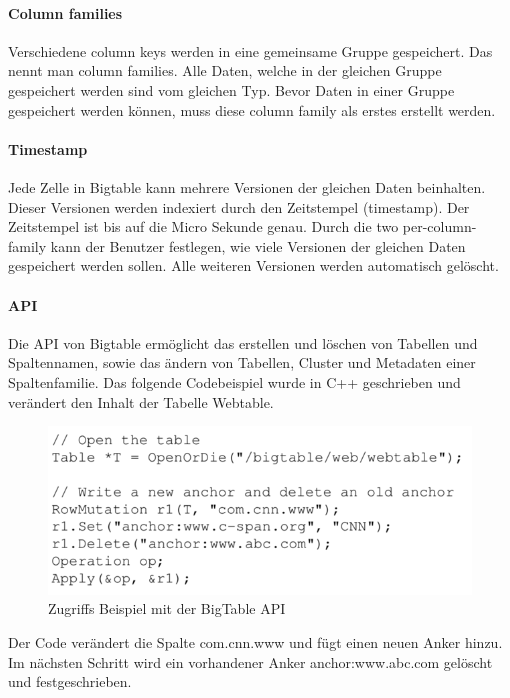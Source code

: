 \paragraph{Column families}
Verschiedene column keys werden in eine gemeinsame Gruppe gespeichert. Das nennt man column families. Alle Daten, welche in der gleichen Gruppe gespeichert werden sind vom gleichen Typ. Bevor Daten in einer Gruppe gespeichert werden können, muss diese column family als erstes erstellt werden.

\paragraph{Timestamp}
Jede Zelle in Bigtable kann mehrere Versionen der gleichen Daten beinhalten. Dieser Versionen werden indexiert durch den Zeitstempel (timestamp). Der Zeitstempel ist bis auf die Micro Sekunde genau. Durch die \glqq two per-column-family \grqq kann der Benutzer festlegen, wie viele Versionen der gleichen Daten gespeichert werden sollen. Alle weiteren Versionen werden automatisch gelöscht.

\paragraph{API}
Die API von Bigtable ermöglicht das erstellen und löschen von Tabellen und Spaltennamen, sowie das ändern von Tabellen, Cluster und Metadaten einer Spaltenfamilie. Das folgende Codebeispiel wurde in C++ geschrieben und verändert den Inhalt der Tabelle Webtable. 

\begin{figure}[!htpb]
	\centering
	\includegraphics[]{pics/bigtable_api.png}
	\caption {Zugriffs Beispiel mit der BigTable API}
\end{figure}

Der Code verändert die Spalte \glqq com.cnn.www \grqq und fügt einen neuen Anker hinzu. Im nächsten Schritt wird ein vorhandener Anker \glqq anchor:www.abc.com \grqq gelöscht und festgeschrieben.


